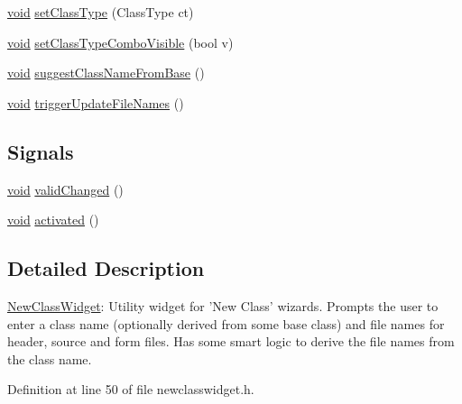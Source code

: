 \begin{DoxyCompactItemize}
\hyperlink{group___u_a_v_objects_plugin_ga444cf2ff3f0ecbe028adce838d373f5c}{void} \hyperlink{class_utils_1_1_new_class_widget_a9aeaee196b94c58267ff4b2622a8d1a5}{set\-Class\-Type} (\-Class\-Type ct)
\item 
\hyperlink{group___u_a_v_objects_plugin_ga444cf2ff3f0ecbe028adce838d373f5c}{void} \hyperlink{class_utils_1_1_new_class_widget_aad6a1f983a3d59926fb6e4b720b04dab}{set\-Class\-Type\-Combo\-Visible} (bool v)
\item 
\hyperlink{group___u_a_v_objects_plugin_ga444cf2ff3f0ecbe028adce838d373f5c}{void} \hyperlink{class_utils_1_1_new_class_widget_ad48d60f3a08cd63f585d70459c168bbe}{suggest\-Class\-Name\-From\-Base} ()
\item 
\hyperlink{group___u_a_v_objects_plugin_ga444cf2ff3f0ecbe028adce838d373f5c}{void} \hyperlink{class_utils_1_1_new_class_widget_a362e135893f1c158324cf654ae8e59ee}{trigger\-Update\-File\-Names} ()
\end{DoxyCompactItemize}
\subsection*{\-Signals}
\begin{DoxyCompactItemize}
\item 
\hyperlink{group___u_a_v_objects_plugin_ga444cf2ff3f0ecbe028adce838d373f5c}{void} \hyperlink{class_utils_1_1_new_class_widget_a603d6f317cf4d6bea477ae93a153ce2f}{valid\-Changed} ()
\item 
\hyperlink{group___u_a_v_objects_plugin_ga444cf2ff3f0ecbe028adce838d373f5c}{void} \hyperlink{class_utils_1_1_new_class_widget_afdf63ac05df1b4688fbf3b2999a4c524}{activated} ()
\end{DoxyCompactItemize}


\subsection{\-Detailed \-Description}
\hyperlink{class_utils_1_1_new_class_widget}{\-New\-Class\-Widget}\-: \-Utility widget for '\-New \-Class' wizards. \-Prompts the user to enter a class name (optionally derived from some base class) and file names for header, source and form files. \-Has some smart logic to derive the file names from the class name. 

\-Definition at line 50 of file newclasswidget.\-h.



